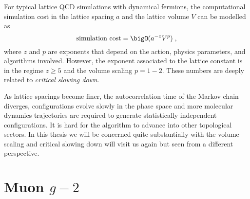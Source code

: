 For typical lattice QCD simulations with dynamical fermions, the computational simulation cost in the lattice spacing $a$ and the lattice volume $V$ can be modelled as~\cite{Luscher:1998pe}
\begin{equation}
\text{simulation cost} = \bigO( a^{-z} V^{p} )\;,
\end{equation}
where $z$ and $p$ are exponents that depend on the action, physics parameters, and algorithms involved.
However, the exponent associated to the lattice constant is in the regime $z \geq 5$ and the volume scaling $p = 1-2$.
These numbers are deeply related to \emph{critical slowing down}.

As lattice spacings become finer, the autocorrelation time of the Markov chain diverges, configurations evolve slowly in the phase space and more molecular dynamics trajectories are required to generate statistically independent configurations.
It is hard for the algorithm to advance into other topological sectors.
In this thesis we will be concerned quite substantially with the volume scaling and critical slowing down will visit us again but seen from a different perspective.




























\section{Muon $g-2$}
\label{sec:intro:gm2}


